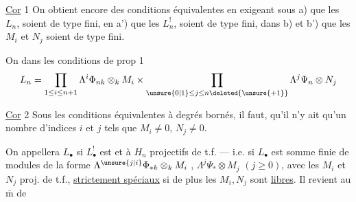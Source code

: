 \uline{Cor} 1   On obtient encore des conditions équivalentes en exigeant  sous a) que les $L_n$,  soient de type fini, en a') que les $L_n^!$,  soient de type fini, dans b) et b') que les $M_i$ et $N_j$ soient de type fini.

On  dans les conditions de prop 1
\[
 L_n=\prod_{1\leq i\leq n+1}\Lambda^{i}\Phi_{n k}\otimes_k M_i
 \times\prod_{\unsure{0|1}\leq j\leq n\deleted{\unsure{+1}}}\Lambda^j\Psi_n\otimes N_j
\]

\uline{Cor} 2 Sous les conditions équivalentes     à degrés bornés, il faut\unsure{)}, qu'il n'y ait qu'un nombre  d'indices $i$ et $j$ tels que $M_i\ne0$, $N_j\ne0$.

 On appellera  $L_{\bullet}$     si $L_{\bullet}^!$ est   et à $H_n$ projectifs de t.f. --- i.e. si $L_{\bullet}$ est \inserted{$\simeq$} somme finie de modules de la forme  $\Lambda^{\unsure{j|i}}\Phi_{*k}\otimes_k M_i$ , $\Lambda^j\Psi_*\otimes M_j$ $(j\geq0)$, avec les $M_i$ et $N_j$ proj. de t.f., \uline{strictement spéciaux} si de plus les $M_i,N_j$ sont \uline{libres}. Il revient au $\overline{\mathrm m}$ de
